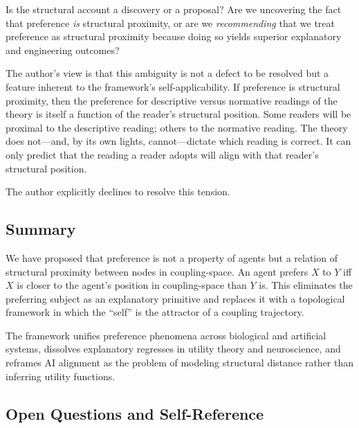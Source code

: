 \documentclass[12pt,a4paper]{article}
\begin{document}
Is the structural account a discovery or a proposal? Are we uncovering the fact that preference \emph{is} structural proximity, or are we \emph{recommending} that we treat preference as structural proximity because doing so yields superior explanatory and engineering outcomes?

The author's view is that this ambiguity is not a defect to be resolved but a feature inherent to the framework's self-applicability. If preference is structural proximity, then the preference for descriptive versus normative readings of the theory is itself a function of the reader's structural position. Some readers will be proximal to the descriptive reading; others to the normative reading. The theory does not---and, by its own lights, cannot---dictate which reading is correct. It can only predict that the reading a reader adopts will align with that reader's structural position.

The author explicitly declines to resolve this tension.%

\subsection{Summary}

We have proposed that preference is not a property of agents but a relation of structural proximity between nodes in coupling-space. An agent prefers $X$ to $Y$ iff $X$ is closer to the agent's position in coupling-space than $Y$ is. This eliminates the preferring subject as an explanatory primitive and replaces it with a topological framework in which the ``self'' is the attractor of a coupling trajectory.

The framework unifies preference phenomena across biological and artificial systems, dissolves explanatory regresses in utility theory and neuroscience, and reframes AI alignment as the problem of modeling structural distance rather than inferring utility functions.

\subsection{Open Questions and Self-Reference}
\end{document}
